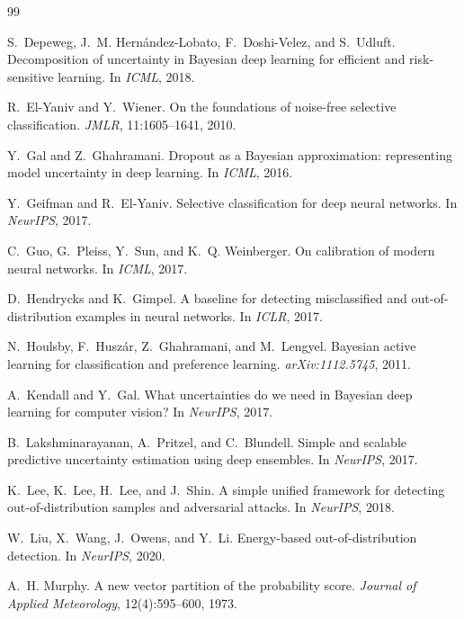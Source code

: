 \documentclass{article}
\begin{document}

\begin{thebibliography}{99}
\small

S.~Depeweg, J.~M. Hern\'andez-Lobato, F.~Doshi-Velez, and S.~Udluft.
\newblock Decomposition of uncertainty in Bayesian deep learning for efficient
  and risk-sensitive learning.
\newblock In \emph{ICML}, 2018.

R.~El-Yaniv and Y.~Wiener.
\newblock On the foundations of noise-free selective classification.
\newblock \emph{JMLR}, 11:1605--1641, 2010.

Y.~Gal and Z.~Ghahramani.
\newblock Dropout as a Bayesian approximation: representing model uncertainty in
  deep learning.
\newblock In \emph{ICML}, 2016.

Y.~Geifman and R.~El-Yaniv.
\newblock Selective classification for deep neural networks.
\newblock In \emph{NeurIPS}, 2017.

C.~Guo, G.~Pleiss, Y.~Sun, and K.~Q. Weinberger.
\newblock On calibration of modern neural networks.
\newblock In \emph{ICML}, 2017.

D.~Hendrycks and K.~Gimpel.
\newblock A baseline for detecting misclassified and out-of-distribution
  examples in neural networks.
\newblock In \emph{ICLR}, 2017.

N.~Houlsby, F.~Husz\'ar, Z.~Ghahramani, and M.~Lengyel.
\newblock Bayesian active learning for classification and preference learning.
\newblock \emph{arXiv:1112.5745}, 2011.

A.~Kendall and Y.~Gal.
\newblock What uncertainties do we need in Bayesian deep learning for computer
  vision?
\newblock In \emph{NeurIPS}, 2017.

B.~Lakshminarayanan, A.~Pritzel, and C.~Blundell.
\newblock Simple and scalable predictive uncertainty estimation using deep
  ensembles.
\newblock In \emph{NeurIPS}, 2017.

K.~Lee, K.~Lee, H.~Lee, and J.~Shin.
\newblock A simple unified framework for detecting out-of-distribution samples
  and adversarial attacks.
\newblock In \emph{NeurIPS}, 2018.

W.~Liu, X.~Wang, J.~Owens, and Y.~Li.
\newblock Energy-based out-of-distribution detection.
\newblock In \emph{NeurIPS}, 2020.

A.~H. Murphy.
\newblock A new vector partition of the probability score.
\newblock \emph{Journal of Applied Meteorology}, 12(4):595--600, 1973.

\end{thebibliography}
\end{document}
